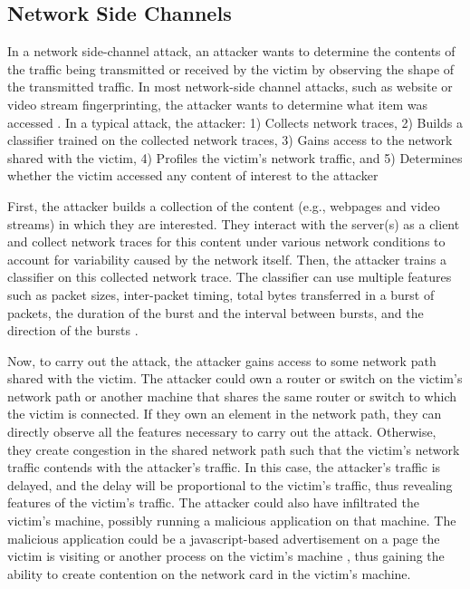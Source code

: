 \subsection{Network Side Channels}
\label{subsec:netshaper-background-network-side-channels}

In a network side-channel attack, an attacker wants to determine the contents of the traffic being transmitted or received by the victim by observing the shape of the transmitted traffic.
In most network-side channel attacks, such as website or video stream fingerprinting, the attacker wants to determine what item was accessed
\cite{bhat2019varcnn, dyer2012peek, hayes2016kfp, sirinam2018df, schuster2017beautyburst}.
In a typical attack, the attacker:
1) Collects network traces,
2) Builds a classifier trained on the collected network traces,
3) Gains access to the network shared with the victim,
4) Profiles the victim's network traffic, and
5) Determines whether the victim accessed any content of interest to the attacker

First, the attacker builds a collection of the content (e.g., webpages and video streams) in which they are interested. 
They interact with the server(s) as a client and collect network traces for this content under various network conditions to account for variability caused by the network itself. 
Then, the attacker trains a classifier on this collected network trace.
The classifier can use multiple features such as packet sizes, inter-packet timing, total bytes transferred in a burst of packets, the duration of the burst and the interval between bursts, and the direction of the bursts \cite{schuster2017beautyburst}.

Now, to carry out the attack, the attacker gains access to some network path shared with the victim.
The attacker could own a router or switch on the victim's network path or another machine that shares the same router or switch to which the victim is connected.
If they own an element in the network path, they can directly observe all the features necessary to carry out the attack. 
Otherwise, they create congestion in the shared network path such that the victim's network traffic contends with the attacker's traffic.
In this case, the attacker's traffic is delayed, and the delay will be proportional to the victim's traffic, thus revealing features of the victim's traffic.
The attacker could also have infiltrated the victim's machine, possibly running a malicious application on that machine.
The malicious application could be a javascript-based advertisement on a page the victim is visiting or another process on the victim's machine \cite{schuster2017beautyburst}, thus gaining the ability to create contention on the network card in the victim's machine. 


